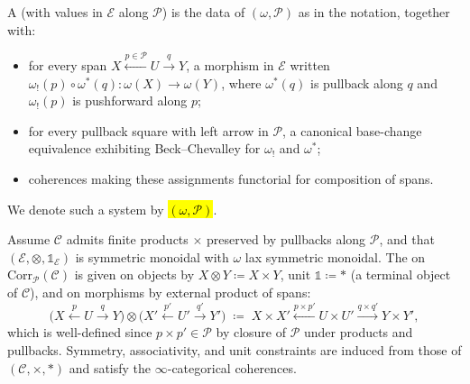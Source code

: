 \begin{definition}
A  (with values in $\mathcal{E}$ along $\mathcal{P}$) is the data of $(\omega,\mathcal{P})$ as in the notation, together with:
\begin{itemize}
\item for every span $X\xleftarrow{p\in \mathcal{P}} U\xrightarrow{q} Y$, a morphism in $\mathcal{E}$ written $\omega_!(p)\circ \omega^*(q)\colon \omega(X)\to \omega(Y)$, where $\omega^*(q)$ is pullback along $q$ and $\omega_!(p)$ is pushforward along $p$;
\item for every pullback square with left arrow in $\mathcal{P}$, a canonical base-change equivalence exhibiting Beck–Chevalley for $\omega_!$ and $\omega^*$;
\item coherences making these assignments functorial for composition of spans.
\end{itemize}
We denote such a system by \hl{$(\omega,\mathcal{P})$}.
\end{definition}

\begin{definition}
Assume $\mathcal{C}$ admits finite products $\times$ preserved by pullbacks along $\mathcal{P}$, and that $(\mathcal{E},\otimes,\mathds{1}_{\mathcal{E}})$ is symmetric monoidal with $\omega$ lax symmetric monoidal. The  on $\mathrm{Corr}_{\mathcal{P}}(\mathcal{C})$ is given on objects by $X\otimes Y \coloneqq X\times Y$, unit $\mathds{1}\coloneqq *$ (a terminal object of $\mathcal{C}$), and on morphisms by external product of spans:
\[
\big(X\xleftarrow{p} U\xrightarrow{q} Y\big)\otimes \big(X'\xleftarrow{p'} U'\xrightarrow{q'} Y'\big)
\;\coloneqq\;
X\times X' \xleftarrow{p\times p'} U\times U' \xrightarrow{q\times q'} Y\times Y',
\]
which is well-defined since $p\times p'\in \mathcal{P}$ by closure of $\mathcal{P}$ under products and pullbacks. Symmetry, associativity, and unit constraints are induced from those of $(\mathcal{C},\times,*)$ and satisfy the $\infty$-categorical coherences.
\end{definition}


